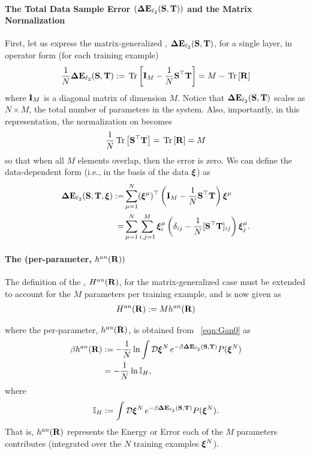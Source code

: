 \paragraph{The Total Data Sample Error $(\mathbf{\Delta {E}}_{\ell_2}({\mathbf{S}},{\mathbf{T}}))$ and the Matrix Normalization}
First, let us express the matrix-generalized \TotalDataSampleError, $\mathbf{\Delta {E}}_{\ell_2}({\mathbf{S}},{\mathbf{T}})$, for a single layer,
in operator form (for each training example)
\begin{align}
 \label{eqn:DETOPST}
 \frac{1}{N}\mathbf{\Delta {E}}_{\ell_2}({\mathbf{S}},{\mathbf{T}})  := \mbox{}\operatorname{Tr}\left[\mathbf{I}_{M} - \frac{1}{N}{\mathbf{S}}^{\top}{\mathbf{T}}\right] = M - \mbox{}\operatorname{Tr}\left[\mathbf{R}\right]
\end{align}
where $\mathbf{I}_{M}$ is a diagonal matrix of dimension $M$.
Notice that $\mathbf{\Delta {E}}_{\ell_2}({\mathbf{S}},{\mathbf{T}})$ scales as $N\times M$, the total number of parameters in the system.
Also, importantly, in this representation, the normalization on becomes
\begin{align}
 \label{eqn:matNorm}
\frac{1}{N}\mbox{}\operatorname{Tr}\left[{\mathbf{S}}^{\top}{\mathbf{T}}\right] = \mbox{}\operatorname{Tr}\left[\mathbf{R}\right] = M
\end{align}
so that when all $M$ elements overlap, then the error is zero.
%                                                                                                                                                                
We can define the data-dependent form (i.e., in the basis of the data $\boldsymbol{\xi}$) as
\begin{align}
\nonumber
\mathbf{\Delta {E}}_{\ell_2}({\mathbf{S}},{\mathbf{T}}, \boldsymbol{\xi})
   :=& \sum_{\mu=1}^{N} (\boldsymbol{\xi}^{\mu})^{\top} \left( \mathbf{I}_{M} - \frac{1}{N} {\mathbf{S}}^{\top}{\mathbf{T}} \right) \boldsymbol{\xi}^{\mu} \\
\label{eqn:DETOPNN}
    =&  \sum_{\mu=1}^{N} \sum_{i,j=1}^{M} \boldsymbol{\xi}_i^{\mu} \left( \delta_{ij} - \frac{1}{N} [{\mathbf{S}}^{\top}{\mathbf{T}}]_{ij} \right) \boldsymbol{\xi}_j^{\mu}  .
\end{align}

\paragraph{The \AnnealedHamiltonian (per-parameter, $h^{an}(\mathbf{R}))$}
The definition of the \AnnealedHamiltonian, $H^{an}(\mathbf{R})$, for the matrix-generalized case must be extended to account for the $M$ parameters per training example, and is now given as
\begin{align}
 \label{eqn:hanpp}
  H^{an}(\mathbf{R}):=Mh^{an}(\mathbf{R})
\end{align}

where the \AnnealedHamiltonian per-parameter, $h^{an}(\mathbf{R})$, is obtained from \EQN~\ref{eqn:Gan0} as
\begin{align}
\label{eqn:Gan_lnI}
\beta h^{an}(\mathbf{R})
   &:=-\frac{1}{N}\ln   \int\mathcal{D}\boldsymbol{\xi}^{N} \, e^{-\beta \mathbf{\Delta {E}}_{\ell_2}({\mathbf{S}},{\mathbf{T}})} P(\boldsymbol{\xi}^{N}) \\
\nonumber
   &=-\frac{1}{N}\ln \mathbb{I}_{H} ,
\end{align}
where
\begin{align}
\label{eqn:InsideGan}
\mathbb{I}_{H} := \int\mathcal{D}\boldsymbol{\xi}^{N} \, e^{-\beta \mathbf{\Delta {E}}_{\ell_2}({\mathbf{S}},{\mathbf{T}})} P(\boldsymbol{\xi}^{N}) .
\end{align}
That is, $h^{an}(\mathbf{R})$ represents the Energy or Error each of the $M$ parameters contributes
(integrated over the $N$ training examples $\boldsymbol{\xi}^{N}$).

